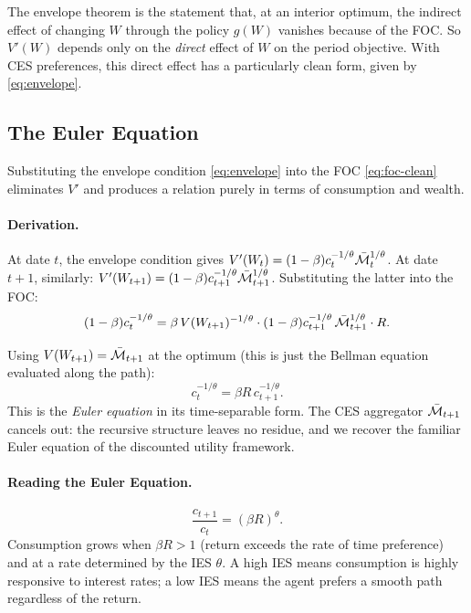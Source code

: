 \begin{calloutnote}
The envelope theorem is the statement that, at an interior optimum, the indirect effect of changing $W$ through the policy $g(W)$ vanishes because of the FOC. So $V'(W)$ depends only on the \emph{direct} effect of $W$ on the period objective. With CES preferences, this direct effect has a particularly clean form, given by \cref{eq:envelope}.
\end{calloutnote}

\subsection{The Euler Equation}
\label{subsec:dp-euler-derivation}

Substituting the envelope condition \cref{eq:envelope} into the FOC \cref{eq:foc-clean} eliminates $V'$ and produces a relation purely in terms of consumption and wealth.

\paragraph{Derivation.}
At date $t$, the envelope condition gives $V'(W_t) = (1-\beta) c_t^{-1/\theta} \bar{\mathcal{M}}_t^{1/\theta}$. At date $t+1$, similarly: $V'(W_{t+1}) = (1-\beta) c_{t+1}^{-1/\theta} \bar{\mathcal{M}}_{t+1}^{1/\theta}$. Substituting the latter into the FOC:
\begin{equation}
(1-\beta) c_t^{-1/\theta} = \beta \, V(W_{t+1})^{-1/\theta} \cdot (1-\beta) c_{t+1}^{-1/\theta} \, \bar{\mathcal{M}}_{t+1}^{1/\theta} \cdot R.
\label{eq:euler-raw}
\end{equation}

Using $V(W_{t+1}) = \bar{\mathcal{M}}_{t+1}$ at the optimum (this is just the Bellman equation evaluated along the path):
\begin{equation}
c_t^{-1/\theta} = \beta R \, c_{t+1}^{-1/\theta}.
\label{eq:euler-deterministic}
\end{equation}
This is the \emph{Euler equation} in its time-separable form. The CES aggregator $\bar{\mathcal{M}}_{t+1}$ cancels out: the recursive structure leaves no residue, and we recover the familiar Euler equation of the discounted utility framework.

\paragraph{Reading the Euler Equation.}
\begin{equation}
\frac{c_{t+1}}{c_t} = (\beta R)^{\theta}.
\label{eq:euler-growth}
\end{equation}
Consumption grows when $\beta R > 1$ (return exceeds the rate of time preference) and at a rate determined by the IES $\theta$. A high IES means consumption is highly responsive to interest rates; a low IES means the agent prefers a smooth path regardless of the return.

